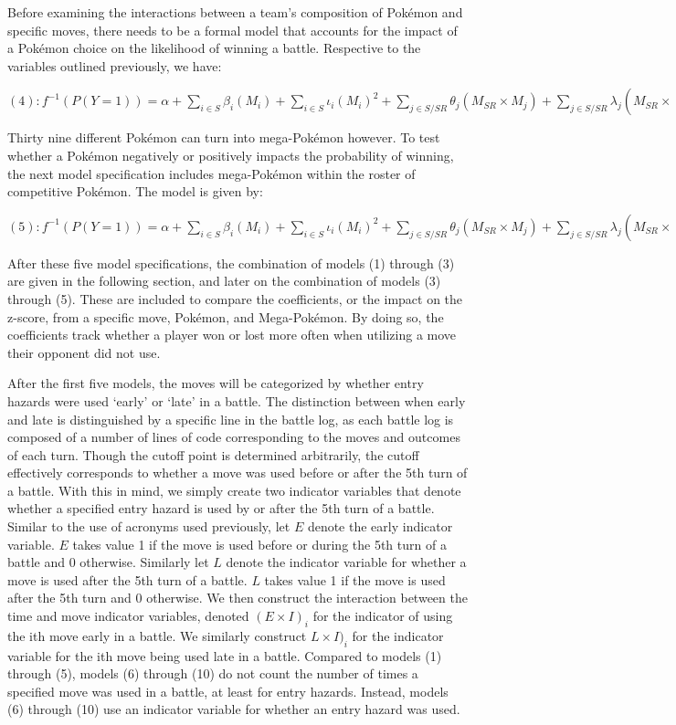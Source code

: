 \documentclass[12pt,twoside]{reedthesis}
\begin{document}
  Before examining the interactions between a team's composition of
  Pokémon and specific moves, there needs to be a formal model that
  accounts for the impact of a Pokémon choice on the likelihood of winning
  a battle. Respective to the variables outlined previously, we have:
  
  \((4): f^{-1}(P(Y=1)) = \alpha + \sum_{i \in S} \beta_i(M_i) + \sum_{i \in S} \iota_i(M_i)^2 + \sum_{j \in S/{SR}} \theta_j(M_{SR} \times M_j) + \sum_{j \in S/{SR}} \lambda_j(M_{SR} \times (M_j)^2) + \sum_{l \in P} \gamma_l(PU_l)\)
  
  Thirty nine different Pokémon can turn into mega-Pokémon however. To
  test whether a Pokémon negatively or positively impacts the probability
  of winning, the next model specification includes mega-Pokémon within
  the roster of competitive Pokémon. The model is given by:
  
  \((5): f^{-1}(P(Y=1)) = \alpha + \sum_{i \in S} \beta_i(M_i) + \sum_{i \in S} \iota_i(M_i)^2 + \sum_{j \in S/{SR}} \theta_j(M_{SR} \times M_j) + \sum_{j \in S/{SR}} \lambda_j(M_{SR} \times (M_j)^2) + \sum_{l \in P} \gamma_l(PU_l) + \sum_{k \in G} \tau_k(GU_k)\)
  
  After these five model specifications, the combination of models (1)
  through (3) are given in the following section, and later on the
  combination of models (3) through (5). These are included to compare the
  coefficients, or the impact on the z-score, from a specific move,
  Pokémon, and Mega-Pokémon. By doing so, the coefficients track whether a
  player won or lost more often when utilizing a move their opponent did
  not use.
  
  After the first five models, the moves will be categorized by whether
  entry hazards were used `early' or `late' in a battle. The distinction
  between when early and late is distinguished by a specific line in the
  battle log, as each battle log is composed of a number of lines of code
  corresponding to the moves and outcomes of each turn. Though the cutoff
  point is determined arbitrarily, the cutoff effectively corresponds to
  whether a move was used before or after the 5th turn of a battle. With
  this in mind, we simply create two indicator variables that denote
  whether a specified entry hazard is used by or after the 5th turn of a
  battle. Similar to the use of acronyms used previously, let \(E\) denote
  the early indicator variable. \(E\) takes value 1 if the move is used
  before or during the 5th turn of a battle and 0 otherwise. Similarly let
  \(L\) denote the indicator variable for whether a move is used after the
  5th turn of a battle. \(L\) takes value 1 if the move is used after the
  5th turn and 0 otherwise. We then construct the interaction between the
  time and move indicator variables, denoted \((E \times I)_i\) for the
  indicator of using the ith move early in a battle. We similarly
  construct \(L \times I)_i\) for the indicator variable for the ith move
  being used late in a battle. Compared to models (1) through (5), models
  (6) through (10) do not count the number of times a specified move was
  used in a battle, at least for entry hazards. Instead, models (6)
  through (10) use an indicator variable for whether an entry hazard was
  used.
  
\end{document}
